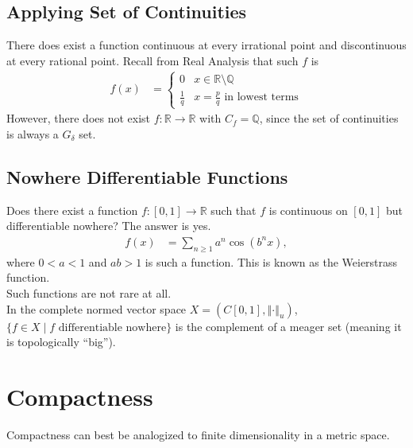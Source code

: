 \documentclass[10pt]{extarticle}
\newcommand{\Q}{\mathbb{Q}}
\newcommand{\R}{\mathbb{R}}
\newcommand{\norm}[1]{\left\Vert #1 \right\Vert}
\begin{document}
  \subsection{Applying Set of Continuities}%
  There does exist a function continuous at every irrational point and discontinuous at every rational point. Recall from Real Analysis that such $f$ is
  \begin{align*}
    f(x) &= \begin{cases}
      0 & x\in \R\setminus \Q\\
      \frac{1}{q} & x = \frac{p}{q}\text{ in lowest terms}
    \end{cases}
  \end{align*}
  However, there does not exist $f: \R\rightarrow \R$ with $C_f = \Q$, since the set of continuities is always a $G_{\delta}$ set.
  \subsection{Nowhere Differentiable Functions}%
  Does there exist a function $f: [0,1]\rightarrow \R$ such that $f$ is continuous on $[0,1]$ but differentiable nowhere? The answer is yes.
  \begin{align*}
    f(x) &= \sum_{n\geq 1} a^n\cos(b^n x),
  \end{align*}
  where $0 < a < 1$ and $ab > 1$ is such a function. This is known as the Weierstrass function.\\

  Such functions are not rare at all.\\

  In the complete normed vector space $X = (C[0,1],\norm{\cdot}_u)$, $\{f\in X\mid f\text{ differentiable nowhere}\}$ is the complement of a meager set (meaning it is topologically ``big'').
  \section{Compactness}%
  Compactness can best be analogized to finite dimensionality in a metric space.\\
\end{document}
